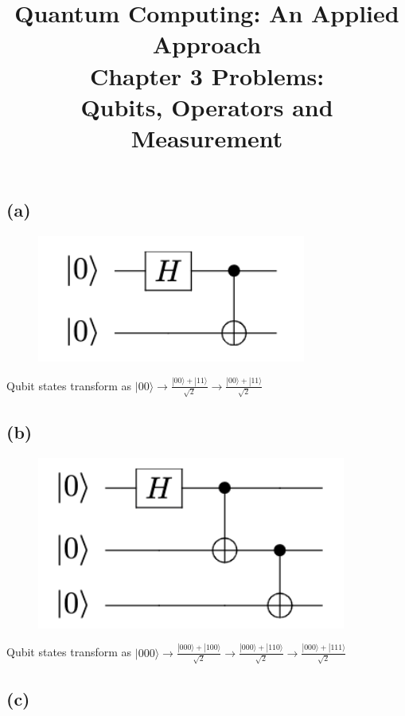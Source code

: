 \documentclass{article}
\date{}
\title{\textbf{Quantum Computing: An Applied Approach}\\\vspace*{1cm}
Chapter 3 Problems: \\
Qubits, Operators and Measurement
}
\begin{document}
\maketitle

\section{}

\subsection*{(a)}

\begin{figure}[H]
  \centering
  \includegraphics[width=0.4 \linewidth]{images/circuit_diagram_1.png}
\end{figure}

Qubit states transform as $|00\rangle\rightarrow\frac{|00\rangle+|11\rangle}{\sqrt{2}}\rightarrow\boxed{\frac{|00\rangle+|11\rangle}{\sqrt{2}}}$

\subsection*{(b)}

\begin{figure}[H]
  \centering
  \includegraphics[width=0.4 \linewidth]{images/circuit_diagram_2.png}
\end{figure}

Qubit states transform as $|000\rangle\rightarrow
\frac{|000\rangle+|100\rangle}{\sqrt{2}}\rightarrow
\frac{|000\rangle+|110\rangle}{\sqrt{2}}\rightarrow
\boxed{\frac{|000\rangle+|111\rangle}{\sqrt{2}}}$

\subsection*{(c)}
\end{document}
